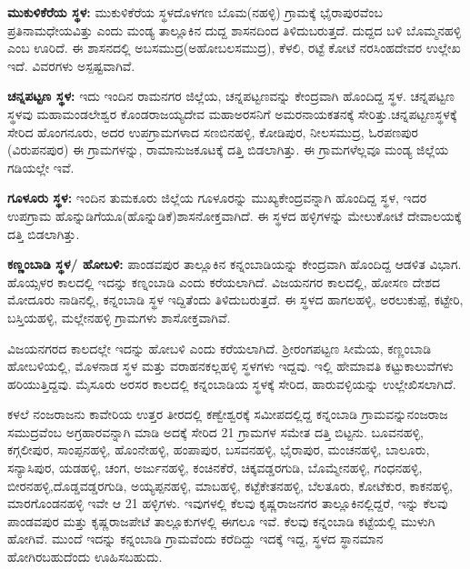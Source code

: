 \textbf{ಮುಕುಳಿಕೆರೆಯ ಸ್ಥಳ:} ಮುಕುಳಿಕೆರೆಯ ಸ್ಥಳದೊಳಗಣ ಬೊಮ(ನಹಳ್ಳಿ) ಗ್ರಾಮಕ್ಕೆ ಭೈರಾಪುರವೆಂಬ ಪ್ರತಿನಾಮ\-ಧೇಯವಿತ್ತು ಎಂದು ಮಂಡ್ಯ ತಾಲ್ಲೂಕಿನ ದುದ್ದ ಶಾಸನದಿಂದ ತಿಳಿದುಬರುತ್ತದೆ. ದುದ್ದದ ಬಳಿ ಬೊಮ್ಮನಹಳ್ಳಿ ಎಂಬ ಊರಿದೆ. ಈ ಶಾಸನದಲ್ಲಿ ಅಬಸಮುದ್ರ(ಅಹೋಬಲಸಮುದ್ರ), ಕೆಳಲಿ, ರಟ್ಟೆ ಕೋಟೆ ನರಸಿಂಹದೇವರ ಉಲ್ಲೇಖ ಇದೆ. ವಿವರಗಳು ಅಸ್ಪಷ್ಟವಾಗಿವೆ.

\textbf{ಚನ್ನಪಟ್ಟಣ ಸ್ಥಳ:} ಇದು ಇಂದಿನ ರಾಮನಗರ ಜಿಲ್ಲೆಯ, ಚನ್ನಪಟ್ಟಣವನ್ನು ಕೇಂದ್ರವಾಗಿ ಹೊಂದಿದ್ದ ಸ್ಥಳ. ಚನ್ನಪಟ್ಟಣ ಸ್ಥಳವು ಮಹಾಮಂಡಲೇಶ್ವರ ಕೊಂಡರಾಜಯ್ಯದೇವ ಮಹಾಅರಸನಿಗೆ ಅಮರನಾಯಕತನಕ್ಕೆ ಸೇರಿತ್ತು.\break ಚನ್ನಪಟ್ಟಣಸ್ಥಳಕ್ಕೆ ಸೇರಿದ ಹೊಂಗನೂರು, ಅದರ ಉಪಗ್ರಾಮಗಳಾದ ಸಣಬಿನಹಳ್ಳಿ, ಕೋಡಿಪುರ, ನೀಲಸಮುದ್ರ, ಓರಪಣಪುರ (ವಿರುಪನಪುರ) ಈ ಗ್ರಾಮಗಳನ್ನು, ರಾಮಾನುಜಕೂಟಕ್ಕೆ ದತ್ತಿ ಬಿಡಲಾಗಿತ್ತು. ಈ ಗ್ರಾಮಗಳೆಲ್ಲವೂ ಮಂಡ್ಯ ಜಿಲ್ಲೆಯ ಗಡಿಯಲ್ಲೇ ಇವೆ.

\textbf{ಗೂಳೂರು ಸ್ಥಳ: }ಇಂದಿನ ತುಮಕೂರು ಜಿಲ್ಲೆಯ ಗೂಳೂರನ್ನು ಮುಖ್ಯಕೇಂದ್ರವನ್ನಾಗಿ ಹೊಂದಿದ್ದ ಸ್ಥಳ, ಇದರ ಉಪಗ್ರಾಮ ಹೊನ್ನುಡಿಗೆಯೂ(ಹೊನ್ನುಡಿಕೆ)ಶಾಸನೋಕ್ತವಾಗಿದೆ. ಈ ಸ್ಥಳದ ಹಳ್ಳಿಗಳನ್ನು ಮೇಲುಕೋಟೆ ದೇವಾಲಯಕ್ಕೆ ದತ್ತಿ ಬಿಡಲಾಗಿತ್ತು.

\textbf{ಕಣ್ಣಂಬಾಡಿ ಸ್ಥಳ/ ಹೋಬಳಿ:} ಪಾಂಡವಪುರ ತಾಲ್ಲೂಕಿನ ಕನ್ನಂಬಾಡಿಯನ್ನು ಕೇಂದ್ರವಾಗಿ ಹೊಂದಿದ್ದ ಆಡಳಿತ ವಿಭಾಗ. ಹೊಯ್ಸಳರ ಕಾಲದಲ್ಲಿ ಇದನ್ನು ಕಣ್ನಂಬಾಡಿ ಎಂದು ಕರೆಯಲಾಗಿದೆ. ವಿಜಯನಗರ ಕಾಲದಲ್ಲಿ, ಹೋಸಣ ದೇಶದ ಮೋದೂರು ನಾಡಿನಲ್ಲಿ, ಕನ್ನಂಬಾಡಿ ಸ್ಥಳ ಇದ್ದಿತೆಂದು ತಿಳಿದುಬರುತ್ತದೆ. ಈ ಸ್ಥಳದ ಹಾಗಲಹಳ್ಳಿ, ಅರಲುಕುಪ್ಪೆ, ಕಟ್ಟೇರಿ, ಬಸ್ತಿಯಹಳ್ಳಿ, ಮಲ್ಲೇನಹಳ್ಳಿ ಗ್ರಾಮಗಳು ಶಾಸೋಕ್ತವಾಗಿವೆ.

ವಿಜಯನಗರದ ಕಾಲದಲ್ಲೇ ಇದನ್ನು ಹೋಬಳಿ ಎಂದು ಕರೆಯಲಾಗಿದೆ. ಶ‍್ರೀರಂಗಪಟ್ಟಣ ಸೀಮೆಯ, ಕಣ್ಣಂಬಾಡಿ ಹೋಬಳಿಯಲ್ಲಿ, ಮೊಳನಾಡ ಸ್ಥಳ ಮತ್ತು ವರಾಹನಕಲ್ಲಹಳ್ಳಿ ಸ್ಥಳಗಳು ಇದ್ದವು. ಇಲ್ಲಿ ಹೇಮಾವತಿ ಕಟ್ಟುಕಾಲುವೆಗಳು ಹರಿಯುತ್ತಿದ್ದವು. ಮೈಸೂರು ಅರಸರ ಕಾಲದಲ್ಲಿ ಕನ್ನಂಬಾಡಿಯ ಸ್ಥಳಕ್ಕೆ ಸೇರಿದ, ಹಾರುವಳ್ಳಿಯನ್ನು ಉಲ್ಲೇಖಿಸಲಾಗಿದೆ.

ಕಳಲೆ ನಂಜರಾಜನು ಕಾವೇರಿಯ ಉತ್ತರ ತೀರದಲ್ಲಿ ಕಣ್ವೇಶ್ವರಕ್ಕೆ ಸಮೀಪದಲ್ಲಿದ್ದ ಕನ್ನಂಬಾಡಿ ಗ್ರಾಮವನ್ನು\break ನಂಜರಾಜ ಸಮುದ್ರವೆಂಬ ಅಗ್ರಹಾರವನ್ನಾಗಿ ಮಾಡಿ ಅದಕ್ಕೆ ಸೇರಿದ 21 ಗ್ರಾಮಗಳ ಸಮೇತ ದತ್ತಿ ಬಿಟ್ಟನು. ಬೂವನಹಳ್ಳಿ, ಕಗ್ಗಲೀಪುರ, ಸಾಂಪ್ಪನಹಳ್ಳಿ, ಹೊಂನೇಹಳ್ಳಿ, ಹಂಪಾಪುರ, ಬಸವನಹಳ್ಳಿ, ಭೈರಾಪುರ, ಮಂಚನಹಳ್ಳಿ, ಬಾಲೂರು, ಸನ್ಯಾಸಿಪುರ, ಯಡಹಳ್ಳಿ, ಚಂಗ, ಅರ್ಜುನಹಳ್ಳಿ, ಕಂಚಿನಕೆರೆ, ಚಿಕ್ಕವಡ್ಡರಗುಡಿ, ಬೊಮ್ಮೇನಹಳ್ಳಿ, ಗಂಧನಹಳ್ಳಿ, ಬೀರನಹಳ್ಳಿ,\break ದೊಡ್ಡವಡ್ಡರಗುಡಿ, ಅಯ್ಯಪ್ಪನಹಳ್ಳಿ, ಮಾಬಹಳ್ಳಿ, ಕಟ್ಟೆಕೇತನಹಳ್ಳಿ, ಬೆಲತೂರು, ಕೋಟೆಕುರ, ಕಾಕನಹಳ್ಳಿ, ಮಾರಗೊಂಡನಹಳ್ಳಿ ಇವೇ ಆ 21 ಹಳ್ಳಿಗಳು. ಇವುಗಳಲ್ಲಿ ಕೆಲವು ಕೃಷ್ಣರಾಜನಗರ ತಾಲ್ಲೂಕಿನಲ್ಲಿದ್ದರೆ, ಇನ್ನು ಕೆಲವು ಪಾಂಡವಪುರ ಮತ್ತು ಕೃಷ್ಣರಾಜಪೇಟೆ ತಾಲ್ಲೂಕುಗಳಲ್ಲಿ ಈಗಲೂ ಇವೆ. ಕೆಲವು ಕನ್ನಂಬಾಡಿ ಕಟ್ಟೆಯಲ್ಲಿ ಮುಳುಗಿ ಹೋಗಿವೆ. ಮುಂದೆ ಇದನ್ನು ಕನ್ನಂಬಾಡಿ ಗ್ರಾಮವೆಂದು ಕರೆದಿದ್ದು ಇದಕ್ಕೆ ಇದ್ದ, ಸ್ಥಳದ ಸ್ಥಾನಮಾನ ಹೋಗಿರಬಹುದೆಂದು ಊಹಿಸಬಹುದು.

